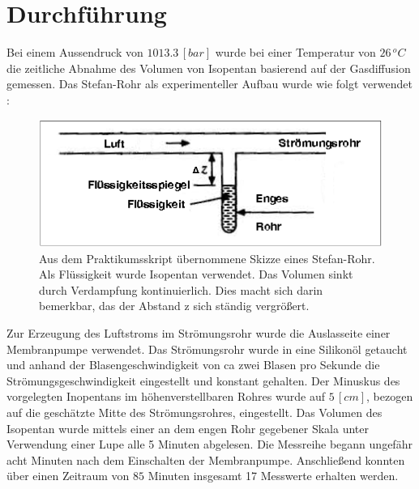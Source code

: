 %
%
\section{Durchführung}
Bei einem Aussendruck von $1013.3\,[\si{bar}]$ wurde bei einer Temperatur von $26\,\si{^oC}$ die zeitliche Abnahme des Volumen von Isopentan basierend auf der Gasdiffusion gemessen. Das Stefan-Rohr als experimenteller Aufbau wurde wie folgt verwendet : 


\begin{figure}[H]

\centering
\includegraphics[width=0.8\linewidth]{stefanrohr.png}
\caption{Aus dem Praktikumsskript übernommene Skizze eines Stefan-Rohr. Als Flüssigkeit wurde Isopentan verwendet. Das Volumen sinkt durch Verdampfung kontinuierlich. Dies macht sich darin bemerkbar, das der Abstand z sich ständig vergrößert.}
\end{figure}

Zur Erzeugung des Luftstroms im Strömungsrohr wurde die Auslasseite einer Membranpumpe verwendet. Das Strömungsrohr wurde in eine Silikonöl getaucht und anhand der  Blasengeschwindigkeit von ca zwei Blasen pro Sekunde die Strömungsgeschwindigkeit eingestellt und konstant gehalten. Der Minuskus des vorgelegten Inopentans im höhenverstellbaren Rohres wurde auf $5\,[\si{cm}]$, bezogen auf die geschätzte Mitte des Strömungsrohres, eingestellt.  Das Volumen des Isopentan wurde mittels einer an dem engen Rohr gegebener Skala unter Verwendung einer Lupe alle 5 Minuten abgelesen. Die Messreihe begann ungefähr acht Minuten nach dem Einschalten der Membranpumpe. Anschließend konnten über einen Zeitraum von $85$ Minuten insgesamt 17 Messwerte erhalten werden.
%
